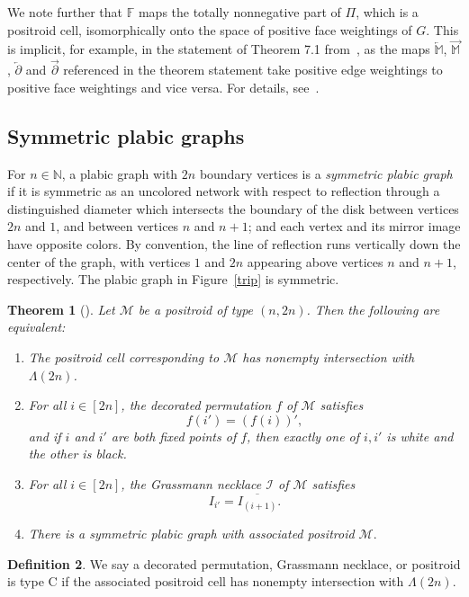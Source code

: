 \documentclass[10pt]{amsart}
\newtheorem{theo}{Theorem}[section]
\theoremstyle{definition}
\newtheorem{defi}[theo]{Definition}
\newcommand{\Lm}{\Lambda}
\begin{document}
We note further that $\mathbb{F}$ maps the totally nonnegative part of $\Pi$, which is a positroid cell, isomorphically onto the space of positive face weightings of $G$. This is implicit, for example, in the statement of Theorem 7.1 from~\cite{MS17}, as the maps $\overleftarrow{\mathbb{M}}$, $\overrightarrow{\mathbb{M}}$, $\overleftarrow{\partial}$ and $\overrightarrow{\partial}$ referenced in the theorem statement take positive edge weightings to positive face weightings and vice versa. For details, see~\cite[Section 5.3--5.4]{MS17}.

\subsection{Symmetric plabic graphs}

For $n \in \mathbb{N}$, a plabic graph with $2n$ boundary vertices is a \emph{symmetric plabic graph} 
if it is symmetric as an uncolored network with respect to reflection through a distinguished diameter which intersects the boundary of the disk between vertices $2n$ and $1$, and between vertices $n$ and $n+1$; and each vertex and its mirror image have opposite colors. By convention, the line of reflection runs vertically down the center of the graph, with vertices $1$ and $2n$ appearing above vertices $n$ and $n+1$, respectively. The plabic graph in Figure~\ref{trip} is symmetric. 

\begin{theo}[\cite{KS18}]
Let $\mathcal{M}$ be a positroid of type $(n, 2n)$. Then the following are equivalent:
\begin{enumerate}
\item The positroid cell corresponding to $\mathcal{M}$ has nonempty intersection with $\Lm(2n)$.
\item For all $i \in [2n]$, the decorated permutation $f$ of $\mathcal{M}$ satisfies 
\[f(i') = (f(i))',\]
and if $i$ and $i'$ are both fixed points of $f$, then exactly one of $i,i'$ is white and the other is black.
\item For all $i \in [2n]$, the Grassmann necklace $\mathcal{I}$ of $\mathcal{M}$ satisfies 
\[I_{i'} = \overline{I_{(i + 1)}}.\]
\item There is a symmetric plabic graph with associated positroid $\mathcal{M}.$
\end{enumerate}
\end{theo}

\begin{defi} We say a decorated permutation, Grassmann necklace, or positroid is type C if the associated positroid cell has nonempty intersection with $\Lm(2n)$.
\end{defi}
 
\end{document}
